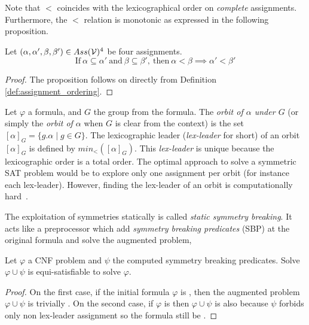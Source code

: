 Note that $<$ coincides with the lexicographical order on \emph{complete}
assignments. Furthermore, the $<$ relation is monotonic as expressed in the following proposition.

\begin{proposition}
	\label{prop:monocity_assignments_ordering}
	Let  $(\alpha,\alpha',\beta,\beta') \in Ass(\mathcal{V})^4 $ be four assignments.
	$$\text{If}~\alpha \subseteq \alpha'~\text{and}~\beta \subseteq \beta',~\text{then}~\alpha < \beta \implies \alpha' < \beta'$$
\end{proposition}

\begin{proof}
	The proposition follows on directly from Definition \ref{def:assignment_ordering}.
\end{proof}


Let $\varphi$ a formula, and $G$ the group from the formula.
The \emph{orbit of $\alpha$ under $G$} (or
simply the \emph{orbit of $\alpha$} when $G$ is clear from the context) is the set
$ [\alpha]_G=\{ g.\alpha \mid g \in G \}$. The lexicographic leader
(\textit{lex-leader} for short) of an orbit $[\alpha]_G$ is defined by
$min_<([\alpha]_G)$. This \textit{lex-leader} is unique because the lexicographic
order is a total order.
The optimal approach to solve a symmetric SAT problem would be to explore
only one assignment per orbit (for instance each lex-leader). However, finding the
lex-leader of an orbit is computationally hard~\cite{Luks2004}. 


The exploitation of symmetries statically is called \emph{static symmetry breaking}.
It acts like a preprocessor which add \emph{symmetry breaking predicates} (SBP) at the 
original formula and solve the augmented problem,


\begin{proposition}
	\label{prop:equi_satisfiability}
	 Let $\varphi$ a CNF problem and $\psi$ the computed symmetry breaking predicates.
	 Solve $\varphi \cup \psi$ is equi-satisfiable to solve $\varphi$.
\end{proposition}

\begin{proof}
	On the first case, if the initial formula $\varphi$ is \unsat,
	then the augmented problem $\varphi \cup \psi$ is trivially \unsat.
	On the second case, if $\varphi$ is \sat then $\varphi \cup \psi$ is also \sat because 
	$\psi$ forbids only non lex-leader assignment so the formula still be \sat.
\end{proof}






